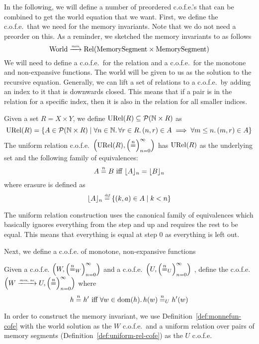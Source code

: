\begin{jversion}
In the following, we will define a number of preordered c.o.f.e.'s that can be combined to get the world equation that we want.
First, we define the c.o.f.e.\ that we need for the memory invariants.
Note that we do not need a preorder on this.
As a reminder, we sketched the memory invariants to as follows
\[
  \World \monfun \Rel{\MemSeg \times \MemSeg}
\]
We will need to define a c.o.f.e.\ for the relation and a c.o.f.e.\ for the monotone and non-expansive functions.
The world will be given to us as the solution to the recursive equation.
Generally, we can lift a set of relations to a c.o.f.e.\ by adding an index to it that is downwards closed.
This means that if a pair is in the relation for a specific index, then it is also in the relation for all smaller indices.
\begin{definition}
  \label{def:uniform-rel-cofe}
  Given a set $R = X \times Y$, we define $\URel{R} \subseteq \powerset{\nats \times R}$ as
  \[
    \URel{R} = \{ A \in \powerset{\nats \times R} \mid \forall n \in \nats \ldotp \forall r \in R \ldotp \npair{r} \in A \implies \forall m \leq n \ldotp \npair[m]{r} \in A\}
  \]
  The uniform relation c.o.f.e.\ $\cofe{\URel{R}}$ has $\URel{R}$ as the underlying set and the following family of equivalences:
  \[
    A \nequal B \text{ iff } \erasen{A}{n} = \erasen{B}{n}
  \]
  where erasure is defined as
  \[
    \erasen{A}{n} \defeq \{(k,a) \in A \mid k < n\}
  \]
\end{definition}
The uniform relation construction uses the canonical family of equivalences which basically ignores everything from the step and up and requires the rest to be equal.
This means that everything is equal at step $0$ as everything is left out.

Next, we define a c.o.f.e. of monotone, non-expansive functions
\begin{definition}
\label{def:monnefun-cofe}
  Given a c.o.f.e. $\left(W,\left(\nequal[n]_W\right)_{n=0}^{\infty}\right)$ and a c.o.f.e.\ $\left(U,\left(\nequal[n]_U\right)_{n=0}^{\infty}\right)$ , define the c.o.f.e.\ $\left(W \monnefun U,\left(\nequal[n]\right)_{n=0}^{\infty} \right)$ where 
  \[
    h \nequal h' \text{ iff } \forall w \in \dom(h) \ldotp h(w) \nequal_U h'(w)
  \]
\end{definition}
In order to construct the memory invariant, we use Definition~\ref{def:monnefun-cofe} with the world solution as the $W$ c.o.f.e.\, and a uniform relation over pairs of memory segments (Definition~\ref{def:uniform-rel-cofe}) as the $U$ c.o.f.e.


\end{jversion}
